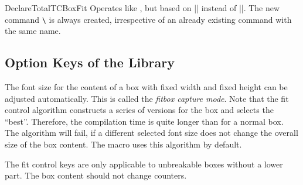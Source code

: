 \begin{docCommand}{DeclareTotalTCBoxFit}{}
  Operates like , but based on |\DeclareDocumentCommand| instead of |\NewDocumentCommand|.
  The new command \texttt{\textbackslash} is always created, irrespective of an already existing
  command with the same name.
\end{docCommand}


\clearpage
\subsection{Option Keys of the Library}\label{subsec:fit}

The font size for the content of a box with fixed width and fixed height
can be adjusted automatically. This is called the \emph{fitbox capture mode}.
Note that the fit control algorithm
constructs a series of versions for the box and selects the \enquote{best}.
Therefore, the compilation time is quite longer than for a normal box.
The algorithm will fail, if a different selected font size does not change the
overall size of the box content.
The  macro uses this algorithm by default.


\medskip
\begin{marker}
  The fit control keys are only applicable to unbreakable boxes without
  a lower part.
  The box content should not change counters.
\end{marker}
\medskip

